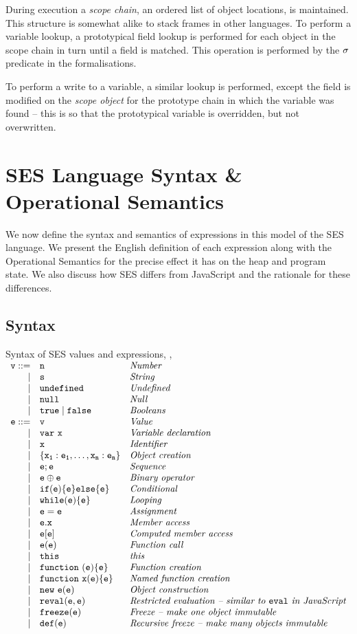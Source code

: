\documentclass[a4paper,notitlepage]{report}
\begin{document}
  During execution a \emph{scope chain}, an ordered list of object locations, is
  maintained. This structure is somewhat alike to stack frames in other languages.
  To perform a variable lookup, a prototypical field lookup is performed for
  each object in the scope chain in turn until a field is matched. This
  operation is performed by the $\sigma$ predicate in the formalisations.

  To perform a write to a variable, a similar lookup is performed, except the
  field is modified on the \emph{scope object} for the prototype chain in which the
  variable was found -- this is so that the prototypical variable is overridden,
  but not overwritten.


\chapter{SES Language Syntax \& Operational Semantics}
  \label{chp:sem}
  We now define the syntax and semantics of expressions in this model of the SES
  language. We present the English definition of each expression along with the
  Operational Semantics for the precise effect it has on the heap and program
  state. We also discuss how SES differs from JavaScript and the rationale for
  these differences.

  \section{Syntax}
  \label{sec:syntax}
  \newcommand{\syntaxline}[3][\pipe]{#1 & \js{#2} & \textit{#3}\\}
    \begin{display}{Syntax of SES values and expressions, , }
      $\begin{array}{rll}
        \syntaxline[\js{v} ::=]{n}{Number}
        \syntaxline{s}{String}
        \syntaxline{\und}{Undefined}
        \syntaxline{\nil}{Null}
        \syntaxline{\true \pipe \false}{Booleans}
        \syntaxline[\js{e} ::=]{v}{Value}
        \syntaxline{\jsvar{x}}{Variable declaration}
        \syntaxline{x}{Identifier}
        \syntaxline{\{x_1:e_1, \ldots, x_n:e_n\}}{Object creation}
        \syntaxline{e; e}{Sequence}
        \syntaxline{e \oplus e}{Binary operator}
        \syntaxline{if(e) \{e\} else \{e\}}{Conditional}
        \syntaxline{while(e) \{e\}}{Looping}
        \syntaxline{e = e}{Assignment}
        \syntaxline{e.x}{Member access}
        \syntaxline{e[e]}{Computed member access}
        \syntaxline{e(e)}{Function call}
        \syntaxline{this}{this}
        \syntaxline{\jsfun{e}{e}}{Function creation}
        \syntaxline{\jsfun[x]{e}{e}}{Named function creation}
        \syntaxline{\jsnew{e}{e}}{Object construction}
        \syntaxline{reval(e, e)}{Restricted evaluation -- similar to \js{eval} in JavaScript}
        \syntaxline{freeze(e)}{Freeze -- make one object immutable}
        \syntaxline{def(e)}{Recursive freeze -- make many objects immutable}
      \end{array}$
    \end{display}
\end{document}
